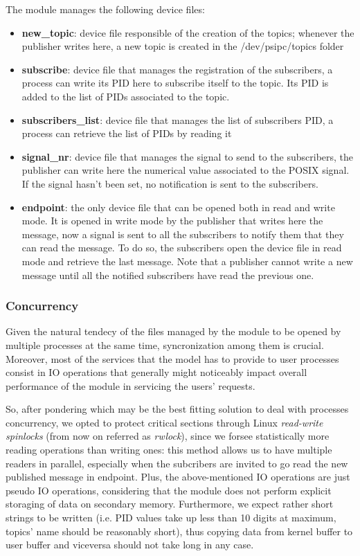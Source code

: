 \documentclass[10pt,a4]{article}
\begin{document}
The module manages the following device files:
\begin{itemize}
  \item \textbf{new\_topic}: device file responsible of the creation of the topics; whenever the publisher writes here, a new topic is created in the /dev/psipc/topics folder
  \item \textbf{subscribe}: device file that manages the registration of the subscribers, a process can write its PID here to subscribe itself to the topic. Its PID is added to the list of PIDs associated to the topic.
  \item \textbf{subscribers\_list}: device file that manages the list of subscribers PID, a process can retrieve the list of PIDs by reading it
  \item \textbf{signal\_nr}: device file that manages the signal to send to the subscribers, the publisher can write here the numerical value associated to the POSIX signal.
  If the signal hasn't been set, no notification is sent to the subscribers.
  \item \textbf{endpoint}: the only device file that can be opened both in read and write mode.
  It is opened in write mode by the publisher that writes here the message, now a signal is sent to all the subscribers to notify them that they can read the message.
  To do so, the subscribers open the device file in read mode and retrieve the last message.
  Note that a publisher cannot write a new message until all the notified subscribers have read the previous one.

\end{itemize}

\subsubsection*{Concurrency}
Given the natural tendecy of the files managed by the module to be opened by multiple processes at the same time, syncronization among them is crucial. Moreover, most of the services that the model has to provide to user processes consist in IO operations that generally might noticeably impact overall performance of the module in servicing the users' requests. 

So, after pondering which may be the best fitting solution to deal with processes concurrency, we opted to protect critical sections through Linux \textit{read-write spinlocks} (from now on referred as \textit{rwlock}), since we forsee statistically more reading operations than writing ones: this method allows us to have multiple readers in parallel, especially when the subcribers are invited to go read the new published message in endpoint. Plus, the above-mentioned IO operations are just pseudo IO operations, considering that the module does not perform explicit storaging of data on secondary memory. Furthermore, we expect rather short strings to be written (i.e. PID values take up less than 10 digits at maximum, topics' name should be reasonably short), thus copying data from kernel buffer to user buffer and viceversa should not take long in any case.
\end{document}
